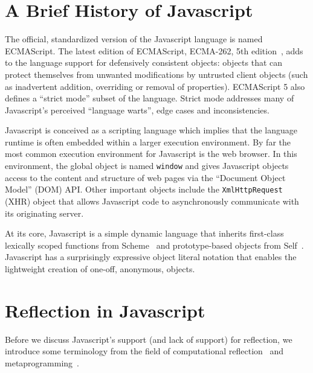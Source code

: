 \documentclass{acm_proc_article-sp}
\begin{document}
\section{A Brief History of Javascript}

The official, standardized version of the Javascript language is named ECMAScript. The latest edition of ECMAScript, ECMA-262, 5th edition~\cite{ecma262}, adds to the language support for defensively consistent objects: objects that can protect themselves from unwanted modifications by untrusted client objects (such as inadvertent addition, overriding or removal of properties). ECMAScript 5 also defines a ``strict mode'' subset of the language. Strict mode addresses many of Javascript's perceived ``language warts'', edge cases and inconsistencies.

Javascript is conceived as a scripting language which implies that the language runtime is often embedded within a larger execution environment. By far the most common execution environment for Javascript is the web browser. In this environment, the global object is named \texttt{window} and gives Javascript objects access to the content and structure of web pages via the ``Document Object Model'' (DOM) API. Other important objects include the \texttt{XmlHttpRequest} (XHR) object that allows Javascript code to asynchronously communicate with its originating server.

At its core, Javascript is a simple dynamic language that inherits first-class lexically scoped functions from Scheme~\cite{scheme} and prototype-based objects from Self~\cite{self}. Javascript has a surprisingly expressive object literal notation that enables the lightweight creation of one-off, anonymous, objects.

\section{Reflection in Javascript}

Before we discuss Javascript's support (and lack of support) for reflection, we introduce some terminology from the field of computational reflection~\cite{maes-oopsla87} and metaprogramming~\cite{kiczales-artofthemop}.
\end{document}
